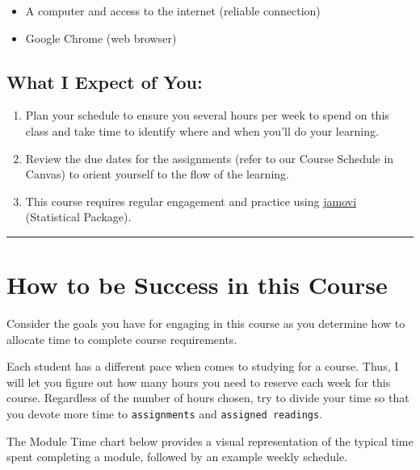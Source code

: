 \documentclass[11pt,]{article}
\providecommand{\tightlist}{%
  \setlength{\itemsep}{0pt}\setlength{\parskip}{0pt}}
\begin{document}
\begin{itemize}
\tightlist
\item
  A computer and access to the internet (reliable connection)
\item
  Google Chrome (web browser)
\end{itemize}

\hypertarget{what-i-expect-of-you}{%
\subsection{What I Expect of You:}\label{what-i-expect-of-you}}

\begin{enumerate}
\def\labelenumi{\arabic{enumi}.}
\tightlist
\item
  Plan your schedule to ensure you several hours per week to spend on
  this class and take time to identify where and when you'll do your
  learning.
\item
  Review the due dates for the assignments (refer to our Course Schedule
  in Canvas) to orient yourself to the flow of the learning.
\item
  This course requires regular engagement and practice using
  \protect\hyperlink{supplies}{jamovi} (Statistical Package).
\end{enumerate}

\begin{center}\rule{0.5\linewidth}{0.5pt}\end{center}

\hypertarget{how-to-be-success-in-this-course}{%
\section{How to be Success in this
Course}\label{how-to-be-success-in-this-course}}

Consider the goals you have for engaging in this course as you determine
how to allocate time to complete course requirements.

Each student has a different pace when comes to studying for a course.
Thus, I will let you figure out how many hours you need to reserve each
week for this course. Regardless of the number of hours chosen, try to
divide your time so that you devote more time to \texttt{assignments}
and \texttt{assigned\ readings}.

The Module Time chart below provides a visual representation of the
typical time spent completing a module, followed by an example weekly
schedule.
\end{document}
